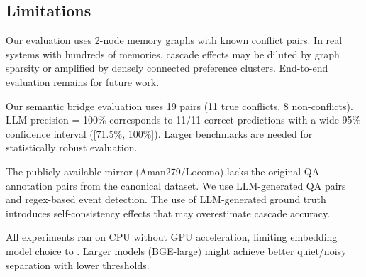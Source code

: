 \subsection{Limitations}
\label{sec:discussion:limits}

Our \horizonbench evaluation uses 2-node memory graphs with known conflict pairs. In real systems with hundreds of memories, cascade effects may be diluted by graph sparsity or amplified by densely connected preference clusters. End-to-end evaluation remains for future work.

Our semantic bridge evaluation uses 19 pairs (11 true conflicts, 8 non-conflicts). LLM precision = 100\% corresponds to 11/11 correct predictions with a wide 95\% confidence interval ([71.5\%, 100\%]). Larger benchmarks are needed for statistically robust evaluation.

The publicly available \locomo mirror (Aman279/Locomo) lacks the original QA annotation pairs from the canonical dataset. We use LLM-generated QA pairs and regex-based event detection. The use of LLM-generated ground truth introduces self-consistency effects that may overestimate cascade accuracy.

All experiments ran on CPU without GPU acceleration, limiting embedding model choice to \miniLM. Larger models (\eg BGE-large) might achieve better quiet/noisy separation with lower thresholds.
